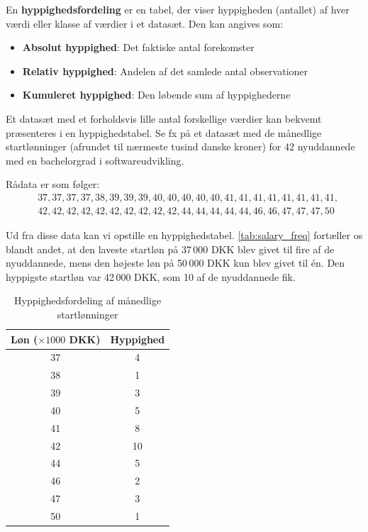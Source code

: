 \begin{definition}[Hyppighedsfordeling]
En \textbf{hyppighedsfordeling} er en tabel, der viser hyppigheden (antallet) af hver værdi eller klasse af værdier i et datasæt. Den kan angives som:
\begin{itemize}
    \item \textbf{Absolut hyppighed}: Det faktiske antal forekomster
    \item \textbf{Relativ hyppighed}: Andelen af det samlede antal observationer
    \item \textbf{Kumuleret hyppighed}: Den løbende sum af hyppighederne
\end{itemize}
\end{definition}

\begin{example}
Et datasæt med et forholdsvis lille antal forskellige værdier kan bekvemt præsenteres i en hyppighedstabel. Se fx på et datasæt med de månedlige startlønninger (afrundet til nærmeste tusind danske kroner) for 42 nyuddannede med en bachelorgrad i softwareudvikling.

Rådata er som følger:
\[
\begin{aligned}
&37, 37, 37, 37, 38, 39, 39, 39, 40, 40, 40, 40, 40, 41, 41, 41, 41, 41, 41, 41, 41, \\
&42, 42, 42, 42, 42, 42, 42, 42, 42, 42, 44, 44, 44, 44, 44, 46, 46, 47, 47, 47, 50
\end{aligned}
\]

Ud fra disse data kan vi opstille en hyppighedstabel. \autoref{tab:salary_freq} fortæller os blandt andet, at den laveste startløn på 37\,000 DKK blev givet til fire af de nyuddannede, mens den højeste løn på 50\,000 DKK kun blev givet til én. Den hyppigste startløn var 42\,000 DKK, som 10 af de nyuddannede fik.

\begin{table}[htbp]
\centering
\renewcommand{\arraystretch}{1.2}
{
\begin{tabular}{cc}
\toprule
\textbf{Løn (\(\times 1000\) DKK)} & \textbf{Hyppighed} \\
\midrule
37 & 4 \\
38 & 1 \\
39 & 3 \\
40 & 5 \\
41 & 8 \\
42 & 10 \\
44 & 5 \\
46 & 2 \\
47 & 3 \\
50 & 1 \\
\bottomrule
\end{tabular}
}
\caption{Hyppighedsfordeling af månedlige startlønninger}
\label{tab:salary_freq}
\end{table}
\end{example}

